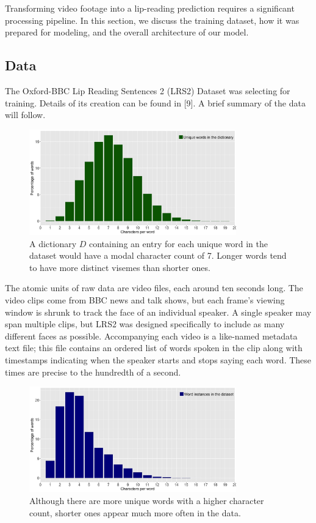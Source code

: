 \documentclass{article}
\begin{document}
Transforming video footage into a lip-reading prediction requires a significant processing pipeline. In this section, we discuss the training dataset, how it was prepared for modeling, and the overall architecture of our model.

\subsection{Data}

The Oxford-BBC Lip Reading Sentences 2 (LRS2) Dataset was selecting for training. Details of its creation can be found in [9]. A brief summary of the data will follow.

  \begin{figure}[h!]
 \centering
  \includegraphics[width=0.8\textwidth]{uniqueWords}
 \caption{A dictionary $D$ containing an entry for each unique word in the dataset would have a modal character count of 7. Longer words tend to have more distinct visemes than shorter ones.}
 \end{figure}
 
The atomic units of raw data are video files, each around ten seconds long. The video clips come from BBC news and talk shows, but each frame's viewing window is shrunk to track the face of an individual speaker. A single speaker may span multiple clips, but LRS2 was designed specifically to include as many different faces as possible. Accompanying each video is a like-named metadata text file; this file contains an ordered list of words spoken in the clip along with timestamps indicating when the speaker starts and stops saying each word. These times are precise to the hundredth of a second.

   \begin{figure}[h!]
 \centering
  \includegraphics[width=0.8\textwidth]{wordInstances}
 \caption{Although there are more unique words with a higher character count, shorter ones appear much more often in the data.}
 \end{figure}
\end{document}
